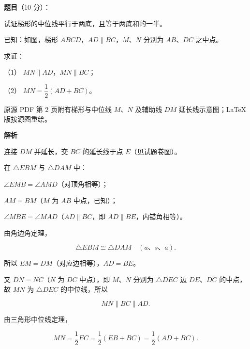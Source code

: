 \begin{answer}

\textbf{题目}（10 分）：

试证梯形的中位线平行于两底，且等于两底和的一半。

已知：如图，梯形 $ABCD$，$AD\parallel BC$，$M\text{、}N$ 分别为 $AB\text{、}DC$ 之中点。

求证：

（1） $MN\parallel AD$，$MN\parallel BC$；

（2） $MN=\dfrac12(AD+BC)$。

\begin{gktip}
原源 PDF 第 2 页附有梯形与中位线 $M\text{、}N$ 及辅助线 $DM$ 延长线示意图；LaTeX 版按源图重绘。
\end{gktip}
\nopagebreak[4]
\begin{center}\end{center}
\nopagebreak[4]
\textbf{解析}

连接 $DM$ 并延长，交 $BC$ 的延长线于点 $E$（见试题卷图）。
\nopagebreak[4]
\begin{center}\end{center}
\nopagebreak[4]

在 $\triangle EBM$ 与 $\triangle DAM$ 中：

$\angle EMB=\angle AMD$（对顶角相等）；

$AM=BM$（$M$ 为 $AB$ 中点，已知）；

$\angle MBE=\angle MAD$（$AD\parallel BC$，即 $AD\parallel BE$，内错角相等）。

由角边角定理，

\nopagebreak[4]
\[
\triangle EBM\cong\triangle DAM\quad(a\text{、}s\text{、}a).
\]

所以 $EM=DM$（对应边相等），$AD=BE$。

又 $DN=NC$（$N$ 为 $DC$ 中点），即 $M\text{、}N$ 分别为 $\triangle DEC$ 边 $DE\text{、}DC$ 的中点，故 $MN$ 为 $\triangle DEC$ 的中位线，所以

\nopagebreak[4]
\[
MN\parallel BC\parallel AD.
\]


由三角形中位线定理，

\nopagebreak[4]
\[
MN=\frac12EC=\frac12(EB+BC)=\frac12(AD+BC).
\]



\end{answer}
